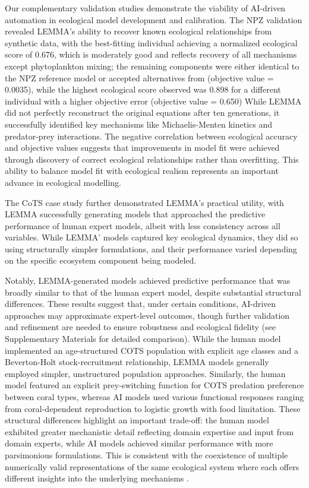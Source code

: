 Our complementary validation studies demonstrate the viability of AI-driven automation in ecological model development and calibration. The NPZ validation revealed LEMMA's ability to recover known ecological relationships from synthetic data, with the best-fitting individual achieving a normalized ecological score of 0.676, which is moderately good and reflects recovery of all mechanisms except phytoplankton mixing; the remaining components were either identical to the NPZ reference model or accepted alternatives from \cite{franks2002npz} (objective value = 0.0035), while the highest ecological score observed was 0.898 for a different individual with a higher objective error (objective value = 0.650) While LEMMA did not perfectly reconstruct the original equations after ten generations, it successfully identified key mechanisms like Michaelis-Menten kinetics and predator-prey interactions. The negative correlation between ecological accuracy and objective values suggests that improvements in model fit were achieved through discovery of correct ecological relationships rather than overfitting. This ability to balance model fit with ecological realism represents an important advance in ecological modelling.

The CoTS case study further demonstrated LEMMA's practical utility, with LEMMA successfully generating models that approached the predictive performance of human expert models, albeit with less consistency across all variables. While LEMMA' models captured key ecological dynamics, they did so using structurally simpler formulations, and their performance varied depending on the specific ecosystem component being modeled.

Notably, LEMMA-generated models achieved predictive performance that was broadly similar to that of the human expert model, despite substantial structural differences. These results suggest that, under certain conditions, AI-driven approaches may approximate expert-level outcomes, though further validation and refinement are needed to ensure robustness and ecological fidelity (see Supplementary Materials for detailed comparison). While the human model implemented an age-structured COTS population with explicit age classes and a Beverton-Holt stock-recruitment relationship, LEMMA models generally employed simpler, unstructured population approaches. Similarly, the human model featured an explicit prey-switching function for COTS predation preference between coral types, whereas AI models used various functional responses ranging from coral-dependent reproduction to logistic growth with food limitation. These structural differences highlight an important trade-off: the human model exhibited greater mechanistic detail reflecting domain expertise and input from domain experts, while AI models achieved similar performance with more parsimonious formulations. This is consistent with the coexistence of multiple numerically valid representations of the same ecological system where each offers different insights into the underlying mechanisms \citep{patterson2001estimating}. 

